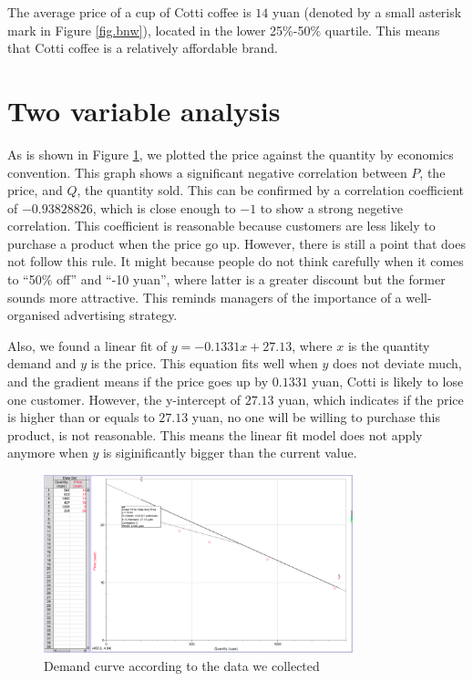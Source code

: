\documentclass[a4paper]{article}
\begin{document}
The average price of a cup of Cotti coffee is $14$ yuan (denoted by a small asterisk mark in Figure \ref{fig.bnw}), located in the lower 25\%-50\% quartile. This means that Cotti coffee is a relatively affordable brand. 



\section{Two variable analysis}

As is shown in Figure \ref{fig.dc}, we plotted the price against the quantity by economics convention. This graph shows a significant negative correlation between $P$, the price, and $Q$, the quantity sold. This can be confirmed by a correlation coefficient of $-0.93828826$, which is close enough to $-1$ to show a strong negetive correlation. This coefficient is reasonable because customers are less likely to purchase a product when the price go up. However, there is still a point that does not follow this rule. It might because people do not think carefully when it comes to ``50\% off'' and ``-10 yuan'', where latter is a greater discount but the former sounds more attractive. This reminds managers of the importance of a well-organised advertising strategy.

Also, we found a linear fit of $y = -0.1331 x + 27.13$, where $x$ is the quantity demand and $y$ is the price. This equation fits well when $y$ does not deviate much, and the gradient means if the price goes up by $0.1331$ yuan, Cotti is likely to lose one customer. However, the y-intercept of $27.13$ yuan, which indicates if the price is higher than or equals to $27.13$ yuan, no one will be willing to purchase this product, is not reasonable. This means the linear fit model does not apply anymore when $y$ is siginificantly bigger than the current value.

\begin{figure}
    \centering
    \includegraphics[width = 0.8\textwidth]{dc.png}
    \caption{Demand curve according to the data we collected}
    \label{fig.dc}
\end{figure}
\end{document}
